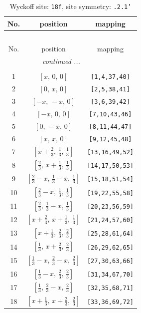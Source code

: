 \documentclass[fleqn,8pt]{jsarticle}
\begin{document}
\begin{longtable}{ccc}
\caption{Wyckoff site: {\tt 18f}, site symmetry: {\tt .2.1'}}
 \\
 \hline \hline
No. & position & mapping \\ \hline \endfirsthead

\multicolumn{2}{l}{\tablename\ \thetable{}} \\
 \hline \hline
No. & position & mapping \\ \hline \endhead

 \hline \hline
\multicolumn{2}{r}{\footnotesize\it continued ...} \\ \endfoot

 \hline \hline
\multicolumn{2}{r}{} \\ \endlastfoot

1 & $\left[ x,\, 0,\, 0 \right]$ & {\tt [1,4,37,40]} \\ \hline
2 & $\left[ 0,\, x,\, 0 \right]$ & {\tt [2,5,38,41]} \\ \hline
3 & $\left[ - x,\, - x,\, 0 \right]$ & {\tt [3,6,39,42]} \\ \hline
4 & $\left[ - x,\, 0,\, 0 \right]$ & {\tt [7,10,43,46]} \\ \hline
5 & $\left[ 0,\, - x,\, 0 \right]$ & {\tt [8,11,44,47]} \\ \hline
6 & $\left[ x,\, x,\, 0 \right]$ & {\tt [9,12,45,48]} \\ \hline
7 & $\left[ x + \frac{2}{3},\, \frac{1}{3},\, \frac{1}{3} \right]$ & {\tt [13,16,49,52]} \\ \hline
8 & $\left[ \frac{2}{3},\, x + \frac{1}{3},\, \frac{1}{3} \right]$ & {\tt [14,17,50,53]} \\ \hline
9 & $\left[ \frac{2}{3} - x,\, \frac{1}{3} - x,\, \frac{1}{3} \right]$ & {\tt [15,18,51,54]} \\ \hline
10 & $\left[ \frac{2}{3} - x,\, \frac{1}{3},\, \frac{1}{3} \right]$ & {\tt [19,22,55,58]} \\ \hline
11 & $\left[ \frac{2}{3},\, \frac{1}{3} - x,\, \frac{1}{3} \right]$ & {\tt [20,23,56,59]} \\ \hline
12 & $\left[ x + \frac{2}{3},\, x + \frac{1}{3},\, \frac{1}{3} \right]$ & {\tt [21,24,57,60]} \\ \hline
13 & $\left[ x + \frac{1}{3},\, \frac{2}{3},\, \frac{2}{3} \right]$ & {\tt [25,28,61,64]} \\ \hline
14 & $\left[ \frac{1}{3},\, x + \frac{2}{3},\, \frac{2}{3} \right]$ & {\tt [26,29,62,65]} \\ \hline
15 & $\left[ \frac{1}{3} - x,\, \frac{2}{3} - x,\, \frac{2}{3} \right]$ & {\tt [27,30,63,66]} \\ \hline
16 & $\left[ \frac{1}{3} - x,\, \frac{2}{3},\, \frac{2}{3} \right]$ & {\tt [31,34,67,70]} \\ \hline
17 & $\left[ \frac{1}{3},\, \frac{2}{3} - x,\, \frac{2}{3} \right]$ & {\tt [32,35,68,71]} \\ \hline
18 & $\left[ x + \frac{1}{3},\, x + \frac{2}{3},\, \frac{2}{3} \right]$ & {\tt [33,36,69,72]} \\
\end{longtable}
\end{document}
